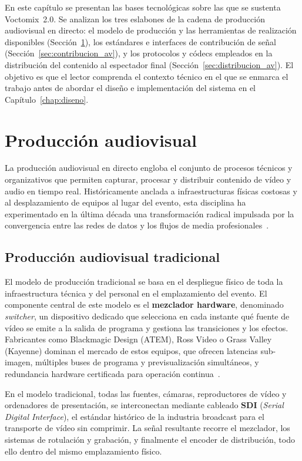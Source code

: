 En este capítulo se presentan las bases tecnológicas sobre las que se sustenta
Voctomix~2.0. Se analizan los tres eslabones de la cadena de producción audiovisual
en directo: el modelo de producción y las herramientas de realización disponibles
(Sección~\ref{sec:produccion_av}), los estándares e interfaces de contribución de señal
(Sección~\ref{sec:contribucion_av}), y los protocolos y códecs empleados en la
distribución del contenido al espectador final (Sección~\ref{sec:distribucion_av}). El
objetivo es que el lector comprenda el contexto técnico en el que se enmarca el
trabajo antes de abordar el diseño e implementación del sistema en el
Capítulo~\ref{chap:diseno}.

\section{Producción audiovisual}
\label{sec:produccion_av}

La producción audiovisual en directo engloba el conjunto de procesos técnicos y
organizativos que permiten capturar, procesar y distribuir contenido de vídeo y audio
en tiempo real. Históricamente anclada a infraestructuras físicas costosas y al
desplazamiento de equipos al lugar del evento, esta disciplina ha experimentado en la
última década una transformación radical impulsada por la convergencia entre las redes
de datos y los flujos de media profesionales~\cite{tmbroadcast_remi}.

\subsection{Producción audiovisual tradicional}

El modelo de producción tradicional se basa en el despliegue físico de toda la
infraestructura técnica y del personal en el emplazamiento del evento. El componente
central de este modelo es el \textbf{mezclador hardware}, denominado
\textit{switcher}, un dispositivo dedicado que selecciona en cada instante qué fuente
de vídeo se emite a la salida de programa y gestiona las transiciones y los efectos.
Fabricantes como Blackmagic Design (ATEM), Ross Video o Grass Valley (Kayenne) dominan
el mercado de estos equipos, que ofrecen latencias sub-imagen, múltiples buses de
programa y previsualización simultáneos, y redundancia hardware certificada para
operación continua~\cite{blackmagic_atem}.

En el modelo tradicional, todas las fuentes, cámaras, reproductores de vídeo y
ordenadores de presentación, se interconectan mediante cableado \textbf{SDI}
(\textit{Serial Digital Interface}), el estándar histórico de la industria broadcast
para el transporte de vídeo sin comprimir. La señal resultante recorre el mezclador,
los sistemas de rotulación y grabación, y finalmente el encoder de distribución, todo
ello dentro del mismo emplazamiento físico.

